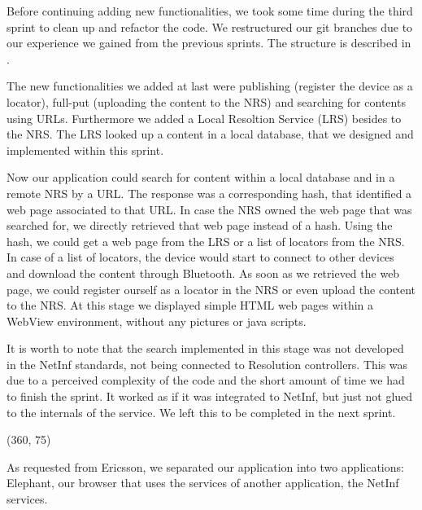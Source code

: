 Before continuing adding new functionalities, we took some time during the third sprint
to clean up and refactor the code. We restructured our git branches due to our
experience we gained from the previous sprints. The structure is described in .

The new functionalities we added at last were publishing (register the 
device as a locator), full-put (uploading the content to the NRS) and
searching for contents using URLs. Furthermore we added a Local Resoltion Service (LRS)
besides to the NRS. The LRS looked up a content in a local database, that we
designed and implemented within this sprint. 

Now our application could search for content within a local database and in a remote
NRS by a URL. The response was a corresponding hash, that identified a
web page associated to that URL. In case the NRS owned the web page that
was searched for, we directly retrieved that web page instead of a hash.
Using the hash, we could get a web page from the LRS or a list of locators
from the NRS. In case of a list of locators, the device would start to
connect to other devices and download the content through Bluetooth.
As soon as we retrieved the web page, we could register ourself as a 
locator in the NRS or even upload the content to the NRS.
At this stage we displayed simple HTML web pages within a WebView environment, without any pictures or
java scripts.

It is worth to note that the search implemented in this stage was not developed in the NetInf
standards, not being connected to Resolution controllers. This was due to a perceived complexity of the code
and the short amount of time we had to finish the sprint. It worked as if it was integrated to NetInf, but 
just not glued to the internals of the service. We left this to be completed in the next sprint.

\framebox(360, 75){
}

As requested from Ericsson, we separated our application into two
applications: Elephant, our browser that uses the services of another application,
the NetInf services. 

